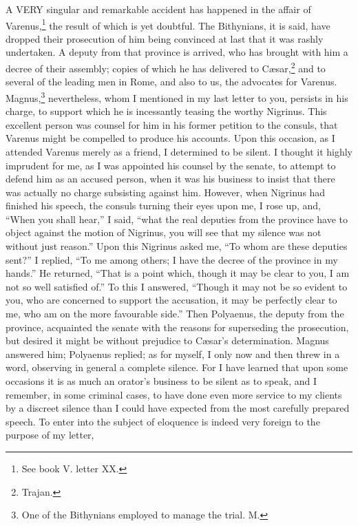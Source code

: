 
A VERY singular and remarkable accident has happened in the affair of
Varenus,\footnote{See book V. letter XX.}
the result of which is yet doubtful. The Bithynians, it is said, have
dropped their prosecution of him being convinced at last that it was
rashly undertaken. A deputy from that province is arrived, who has brought
with him a decree of their assembly; copies of which he has delivered to
Cæsar,\footnote{Trajan.}
and to several of the leading men in Rome, and also to us, the advocates
for Varenus. Magnus,\footnote{One of the Bithynians
employed to manage the trial. M.} nevertheless, whom I mentioned in my last
letter to you, persists in his charge, to support which he is incessantly
teasing the worthy Nigrinus. This excellent person was counsel for him in
his former petition to the consuls, that Varenus might be compelled to
produce his accounts. Upon this occasion, as I attended Varenus merely as
a friend, I determined to be silent. I thought it highly imprudent for me,
as I was appointed his counsel by the senate, to attempt to defend him as
an accused person, when it was his business to insist that there was
actually no charge subsisting against him. However, when Nigrinus had
finished his speech, the consuls turning their eyes upon me, I rose up,
and, ``When you shall hear,'' I said, ``what the real deputies from the
province have to object against the motion of Nigrinus, you will see that
my silence was not without just reason.'' Upon this Nigrinus asked me, ``To
whom are these deputies sent?'' I replied, ``To me among others; I have the
decree of the province in my hands.'' He returned, ``That is a point which,
though it may be clear to you, I am not so well satisfied of.'' To this I
answered, ``Though it may not be so evident to you, who are concerned to
support the accusation, it may be perfectly clear to me, who am on the
more favourable side.'' Then Polyaenus, the deputy from the province,
acquainted the senate with the reasons for superseding the prosecution,
but desired it might be without prejudice to Cæsar's determination. Magnus
answered him; Polyaenus replied; as for myself, I only now and then threw
in a word, observing in general a complete silence. For I have learned
that upon some occasions it is as much an orator's business to be silent
as to speak, and I remember, in some criminal cases, to have done even
more service to my clients by a discreet silence than I could have
expected from the most carefully prepared speech. To enter into the
subject of eloquence is indeed very foreign to the purpose of my letter,
